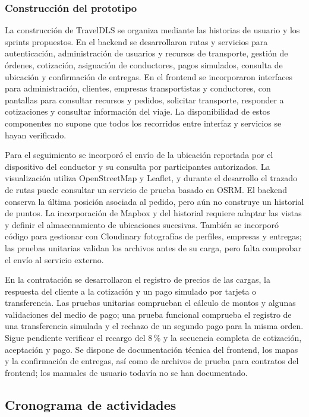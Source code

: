 \subsubsection{Construcción del prototipo}

La construcción de TravelDLS se organiza mediante las historias de usuario y los sprints propuestos. En el backend se desarrollaron rutas y servicios para autenticación, administración de usuarios y recursos de transporte, gestión de órdenes, cotización, asignación de conductores, pagos simulados, consulta de ubicación y confirmación de entregas. En el frontend se incorporaron interfaces para administración, clientes, empresas transportistas y conductores, con pantallas para consultar recursos y pedidos, solicitar transporte, responder a cotizaciones y consultar información del viaje. La disponibilidad de estos componentes no supone que todos los recorridos entre interfaz y servicios se hayan verificado.

Para el seguimiento se incorporó el envío de la ubicación reportada por el dispositivo del conductor y su consulta por participantes autorizados. La visualización utiliza OpenStreetMap y Leaflet, y durante el desarrollo el trazado de rutas puede consultar un servicio de prueba basado en OSRM. El backend conserva la última posición asociada al pedido, pero aún no construye un historial de puntos. La incorporación de Mapbox y del historial requiere adaptar las vistas y definir el almacenamiento de ubicaciones sucesivas. También se incorporó código para gestionar con Cloudinary fotografías de perfiles, empresas y entregas; las pruebas unitarias validan los archivos antes de su carga, pero falta comprobar el envío al servicio externo.

En la contratación se desarrollaron el registro de precios de las cargas, la respuesta del cliente a la cotización y un pago simulado por tarjeta o transferencia. Las pruebas unitarias comprueban el cálculo de montos y algunas validaciones del medio de pago; una prueba funcional comprueba el registro de una transferencia simulada y el rechazo de un segundo pago para la misma orden. Sigue pendiente verificar el recargo del 8\,\% y la secuencia completa de cotización, aceptación y pago. Se dispone de documentación técnica del frontend, los mapas y la confirmación de entregas, así como de archivos de prueba para contratos del frontend; los manuales de usuario todavía no se han documentado.

\subsection{Cronograma de actividades}
\label{sec:cronograma}

